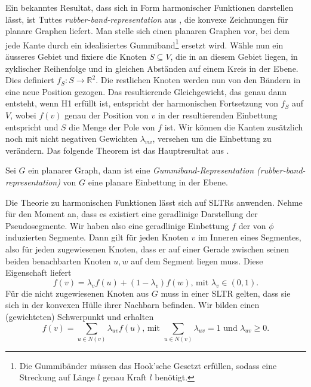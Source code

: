 Ein bekanntes Resultat, dass sich in Form harmonischer Funktionen darstellen lässt, ist Tuttes \textit{rubber-band-representation} aus \cite{tutte63}, die konvexe Zeichnungen für planare Graphen liefert. Man stelle sich einen planaren Graphen vor, bei dem jede Kante durch ein idealisiertes Gummiband\footnote{Die Gummibänder müssen das Hook'sche Gesetzt erfüllen, sodass eine Streckung auf Länge $l$ genau Kraft $l$ benötigt.} ersetzt wird. Wähle nun ein äusseres Gebiet und fixiere die Knoten $S\subseteq V$, die in an diesem Gebiet liegen, in zyklischer Reihenfolge und in gleichen Abständen auf einem Kreis in der Ebene. Dies definiert $f_S:S \to \mathbb{R}^2$. Die restlichen Knoten werden nun von den Bändern in eine neue Position gezogen. Das resultierende Gleichgewicht, das genau dann entsteht, wenn H1 erfüllt ist, entspricht der harmonischen Fortsetzung von $f_S$  auf $V$, wobei $f(v)$ genau der Position von $v$ in der resultierenden Einbettung entspricht und $S$ die Menge der Pole von $f$ ist. Wir können die Kanten zusätzlich noch mit nicht negativen Gewichten $\lambda_{vw}$, versehen um die Einbettung zu verändern. Das folgende Theorem ist das Hauptresultat aus \cite{tutte63}.

\begin{theorem}\label{theo_rubber}
Sei $G$ ein planarer Graph, dann ist eine \textit{Gummiband-Representation (rubber-band-representation)} von $G$ eine planare Einbettung in der Ebene.
\end{theorem}

Die Theorie zu harmonischen Funktionen lässt sich auf SLTRs anwenden. Nehme für den Moment an, dass es existiert eine geradlinige Darstellung der Pseudosegmente. Wir haben also eine geradlinige Einbettung $f$ der von $\phi$ induzierten Segmente. Dann gilt für jeden Knoten $v$ im Inneren eines Segmentes, also für jeden zugewiesenen Knoten, dass er auf einer Gerade zwischen seinen beiden benachbarten Knoten $u,w$ auf dem Segment liegen muss. Diese Eigenschaft liefert
\begin{equation}\label{harm_1}
f(v) = \lambda_v f(u) + (1-\lambda_v)f(w) \text{, mit } \lambda_v \in (0,1).
\end{equation}
Für die nicht zugewiesenen Knoten aus $G$ muss in einer SLTR gelten, dass sie sich in der konvexen Hülle ihrer Nachbarn befinden. Wir bilden einen (gewichteten) Schwerpunkt und erhalten
\begin{equation}\label{harm_2}
f(v) = \sum_{u \in N(v)} \lambda_{uv} f(u) \text{, mit }  \sum_{u \in N(v)}\lambda_{uv} = 1 \text{ und } \lambda_{uv} \geq 0.
\end{equation}

